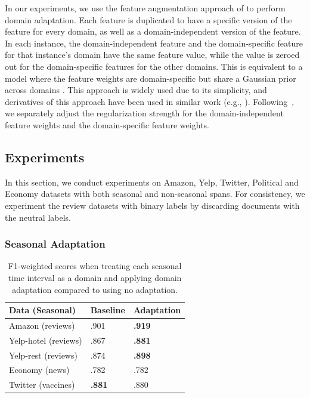 In our experiments, we use the feature augmentation approach of \cite{daume2007frustratingly} to perform domain adaptation. Each feature is duplicated to have a specific version of the feature for every domain, as well as a domain-independent version of the feature. In each instance, the domain-independent feature and the domain-specific feature for that instance's domain have the same feature value, while the value is zeroed out for the domain-specific features for the other domains. This is equivalent to a model where the feature weights are domain-specific but share a Gaussian prior across domains \cite{finkel2009hierarchical}.
This approach is widely used due to its simplicity, and derivatives of this approach have been used in similar work (e.g., \cite{lynn2017human}).
Following~\cite{finkel2009hierarchical}, we separately adjust the regularization strength for the domain-independent feature weights and the domain-specific feature weights.

\subsection{Experiments}

In this section, we conduct experiments on Amazon, Yelp, Twitter, Political and Economy datasets with both seasonal and non-seasonal spans. 
For consistency, we experiment the review datasets with binary labels by discarding documents with the neutral labels.

\subsubsection{Seasonal Adaptation}

\begin{table}[htp]
\centering
\begin{tabular}{|l|l|l|}
\hline
\bf Data (Seasonal) & \bf Baseline & \bf Adaptation \\
\hline
Amazon (reviews) & .901 & \bf .919 \\
Yelp-hotel (reviews) & .867 & \bf .881 \\
Yelp-rest (reviews) & .874 & \bf .898  \\
Economy (news) & .782 & .782  \\
Twitter (vaccines) & \bf .881 & .880  \\
\hline
\end{tabular}
\caption{\label{chap3:tab:results_seasonal} F1-weighted scores when treating each seasonal time interval as a domain and applying domain adaptation compared to using no adaptation.}
\end{table}

